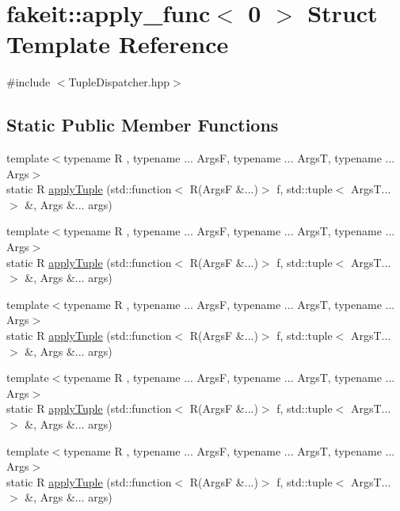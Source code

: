 \hypertarget{structfakeit_1_1apply__func_3_010_01_4}{}\section{fakeit\+::apply\+\_\+func$<$ 0 $>$ Struct Template Reference}
\label{structfakeit_1_1apply__func_3_010_01_4}


{\ttfamily \#include $<$Tuple\+Dispatcher.\+hpp$>$}

\subsection*{Static Public Member Functions}
\begin{DoxyCompactItemize}
\item 
{\footnotesize template$<$typename R , typename ... ArgsF, typename ... ArgsT, typename ... Args$>$ }\\static R \mbox{\hyperlink{structfakeit_1_1apply__func_3_010_01_4_acd870ee59c5ea1915b734577bbbcb831}{apply\+Tuple}} (std\+::function$<$ R(ArgsF \&...)$>$ f, std\+::tuple$<$ Args\+T... $>$ \&, Args \&... args)
\item 
{\footnotesize template$<$typename R , typename ... ArgsF, typename ... ArgsT, typename ... Args$>$ }\\static R \mbox{\hyperlink{structfakeit_1_1apply__func_3_010_01_4_acd870ee59c5ea1915b734577bbbcb831}{apply\+Tuple}} (std\+::function$<$ R(ArgsF \&...)$>$ f, std\+::tuple$<$ Args\+T... $>$ \&, Args \&... args)
\item 
{\footnotesize template$<$typename R , typename ... ArgsF, typename ... ArgsT, typename ... Args$>$ }\\static R \mbox{\hyperlink{structfakeit_1_1apply__func_3_010_01_4_acd870ee59c5ea1915b734577bbbcb831}{apply\+Tuple}} (std\+::function$<$ R(ArgsF \&...)$>$ f, std\+::tuple$<$ Args\+T... $>$ \&, Args \&... args)
\item 
{\footnotesize template$<$typename R , typename ... ArgsF, typename ... ArgsT, typename ... Args$>$ }\\static R \mbox{\hyperlink{structfakeit_1_1apply__func_3_010_01_4_acd870ee59c5ea1915b734577bbbcb831}{apply\+Tuple}} (std\+::function$<$ R(ArgsF \&...)$>$ f, std\+::tuple$<$ Args\+T... $>$ \&, Args \&... args)
\item 
{\footnotesize template$<$typename R , typename ... ArgsF, typename ... ArgsT, typename ... Args$>$ }\\static R \mbox{\hyperlink{structfakeit_1_1apply__func_3_010_01_4_acd870ee59c5ea1915b734577bbbcb831}{apply\+Tuple}} (std\+::function$<$ R(ArgsF \&...)$>$ f, std\+::tuple$<$ Args\+T... $>$ \&, Args \&... args)

\end{DoxyCompactItemize}
